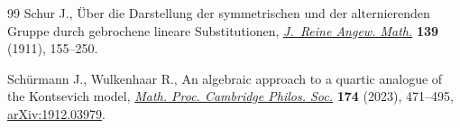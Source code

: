 \documentclass[pdftex]{sigma}
\numberwithin{equation}{section}
\begin{document}
\begin{thebibliography}{99}
Schur J., \"Uber die {D}arstellung der symmetrischen und der alternierenden
 {G}ruppe durch gebrochene lineare {S}ubstitutionen, \href{https://doi.org/10.1515/crll.1911.139.155}{\textit{J.~Reine Angew.
 Math.}} \textbf{139} (1911), 155--250.

Sch\"urmann J., Wulkenhaar R., An algebraic approach to a quartic analogue of
 the {K}ontsevich model, \href{https://doi.org/10.1017/S0305004122000366}{\textit{Math. Proc. Cambridge Philos. Soc.}}
 \textbf{174} (2023), 471--495, \href{https://arxiv.org/abs/1912.03979}{arXiv:1912.03979}.

\end{thebibliography}\LastPageEnding
\end{document}
